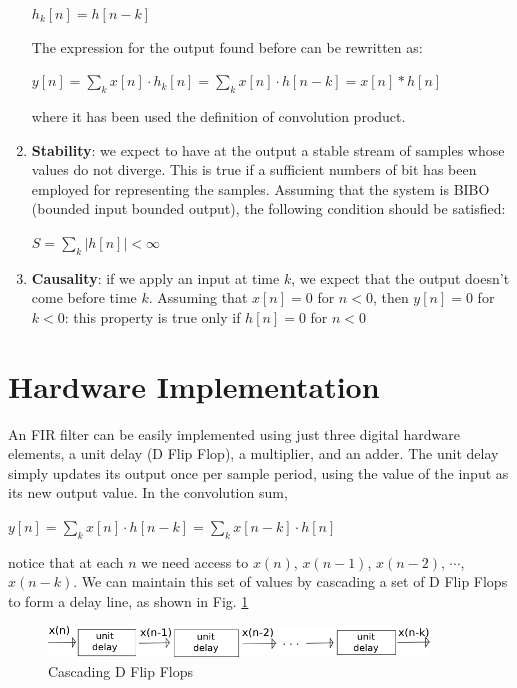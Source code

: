 \begin{enumerate}
    \begin{center}
    	$ h_{k}[n] = h[n-k]  $
    \end{center}
    The expression for the output found before can be rewritten as:
    \begin{center}
    	$ y[n]=\sum\limits_{k}^{ } x[n]\cdot h_{k}[n]= \sum\limits_{k}^{ } x[n]\cdot h[n-k]=x[n]\ast h[n]$
    \end{center}
    where it has been used the definition of convolution product.
    \item \textbf{Stability}: we expect to have at the output a stable stream of samples whose values do not diverge. This is true if a sufficient numbers of bit has been employed for representing the samples. Assuming that the system is BIBO (bounded input bounded output), the following condition should be satisfied: 
    \begin{center}
    	$ S=\sum\limits_{k}^{ } |h[n]| < \infty $
    \end{center}
    \item \textbf{Causality}: if we apply an input at time $ k $,
     we expect that the output doesn't come before time $ k $.
     Assuming that $ x[n] = 0  $ for $ n < 0 $, then $ y[n] = 0 $ for $ k < 0 $: this property is true only if $  h[n] = 0 $ for $ n < 0 $
    
\end{enumerate}

\section{Hardware Implementation}
An FIR filter can be easily implemented using just three digital hardware elements, a unit delay (D Flip Flop), a multiplier, and an adder. The unit delay simply updates its output once per sample period, using the value of the input as its new output value. In the convolution sum,

\begin{center}
	$ 	 y[n]=\sum\limits_{k}^{ } x[n]\cdot h[n-k] =\sum\limits_{k}^{ } x[n-k]\cdot h[n]$
\end{center}
notice that at each $ n $ we need access to $ x(n)$, $x(n - 1)$, $x(n - 2)$, $\cdots$, $x(n - k) $. We can maintain this set of values by cascading a set of D Flip Flops to form a delay line, as shown in Fig. \ref{fig:fir1}
\begin{figure}[h!]
	\centering
	\includegraphics[width=0.9\textwidth]{imm/fir/fir1.png}  
	\caption{Cascading D Flip Flops} 
	\label{fig:fir1}
\end{figure}

